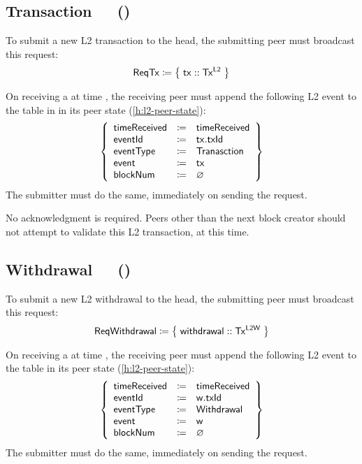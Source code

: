 \documentclass[../hydrozoa.tex]{subfiles}
\begin{document}
\subsection{Transaction~~~()}%
\label{h:l2-consensus-transaction}%

To submit a new L2 transaction to the head, the submitting peer must broadcast this request:
\begin{equation*}
  \mathsf{ReqTx} \coloneq \;\bigr\{\; \mathsf{tx} :: \mathsf{Tx^{L2}} \;\bigr\}
\end{equation*}

On receiving a  at time , the receiving peer must append the following L2 event to the  table in  in its peer state (\cref{h:l2-peer-state}):
\begin{equation*}
  \left\{
  \begin{array}{lll}
    \mathsf{timeReceived} &\coloneq& \mathsf{timeReceived} \\
    \mathsf{eventId} &\coloneq& \mathsf{tx.txId} \\
    \mathsf{eventType} &\coloneq& \mathsf{Tranasction} \\
    \mathsf{event} &\coloneq& \mathsf{tx} \\
    \mathsf{blockNum} &\coloneq& \varnothing
  \end{array}\right\}
\end{equation*}
The submitter must do the same, immediately on sending the request.

No acknowledgment is required.
Peers other than the next block creator should not attempt to validate this L2 transaction, at this time.

\subsection{Withdrawal~~~()}%
\label{h:l2-consensus-withdrawal}%

To submit a new L2 withdrawal to the head, the submitting peer must broadcast this request:
\begin{equation*}
  \mathsf{ReqWithdrawal} \coloneq \;\bigr\{\; \mathsf{withdrawal} :: \mathsf{Tx^{L2W}} \;\bigr\}
\end{equation*}

On receiving a  at time , the receiving peer must append the following L2 event to the  table in its peer state (\cref{h:l2-peer-state}):
\begin{equation*}
  \left\{
  \begin{array}{lll}
    \mathsf{timeReceived} &\coloneq& \mathsf{timeReceived} \\
    \mathsf{eventId} &\coloneq& \mathsf{w.txId} \\
    \mathsf{eventType} &\coloneq& \mathsf{Withdrawal} \\
    \mathsf{event} &\coloneq& \mathsf{w} \\
    \mathsf{blockNum} &\coloneq& \varnothing
  \end{array}\right\}
\end{equation*}
The submitter must do the same, immediately on sending the request.
\end{document}
